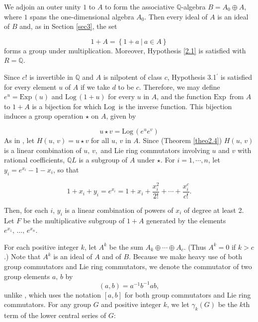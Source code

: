 \documentclass[mathscr]{amsart}
\theoremstyle{theorem}
\theoremstyle{definition}
\numberwithin{equation}{section}
\def \({\left(}
\def \){\right)}
\def \Exp{\text{Exp}\,}
\def \Log{\text{Log}\,}
\begin{document}

We adjoin an outer unity $1$ to $A$ to form the associative
$\mathbb{Q}$-algebra $B=A_0\oplus A$, where $1$ spans the
one-dimensional algebra $A_0$.  Then every ideal of $A$ is an ideal
of $B$ and, as in Section \ref{sec3}, the set

$$1+A=\left\{1+a\ |\ a\in A\right\}$$
forms a group under multiplication.  Moreover, Hypothesis \ref{2.1}
is satisfied with $R=\mathbb{Q}$.

Since $c!$ is invertible in $\mathbb{Q}$ and $A$ is nilpotent of
class $c$, Hypothesis 3.1$^\prime$ %
is satisfied for every element $u$ of $A$ if we take $d$ to be $c$.
Therefore, we may define $e^u=\Exp(u)$ and $\Log(1+u)$ for every $u$
in $A$, and the function $\Exp$ from $A$ to $1+A$ is a bijection for
which $\Log$ is the inverse function.  This bijection induces a
group operation $\star$ on $A$, given by

$$u\star v = \Log\(e^u e^v\)$$
As in \cite{Kh}, let $H(u,\,v)=u\star v$ for all $u,\,v$ in $A$.
Since (Theorem \ref{theo2.4}) $H(u,\,v)$ is a linear combination of
$u,\,v,$ and Lie ring commutators involving $u$ and $v$ with
rational coefficients, $\mathbb{Q}L$ is a subgroup of $A$ under
$\star$. For $i=1,\cdots, n$, let $y_i=e^{x_i}-1-x_i$, so that

\begin{equation} 1+x_i+y_i=e^{x_i}=1+x_i+\frac{x_i^2}{2!}+\cdots +
\frac{x_i^c}{c!}.\label{eq3.2}\end{equation}

Then, for each $i$, $y_i$ is a linear combination of powers of $x_i$
of degree at least 2.  Let $F$ be the multiplicative subgroup of
$1+A$ generated by the elements $e^{x_1},\,\dots,\,e^{x_n}$.

For each positive integer $k$, let $A^k$ be the sum $A_k\oplus
\cdots \oplus A_c$.  (Thus $A^k=0$ if $k>c$.)  Note that $A^k$ is an
ideal of $A$ and of $B$.  Because we make heavy use of both group
commutators and Lie ring commutators, we denote the commutator of
two group elements $a,\,b$ by
$$(a,b)=a^{-1}b^{-1}ab,$$
unlike \cite{Kh}, which uses the notation $[a,b]$ for both group
commutators and Lie ring commutators.  For any group $G$ and
positive integer $k$, we let $\gamma_k(G)$ be the $k$th term of the
lower central series of $G$:
\end{document}
